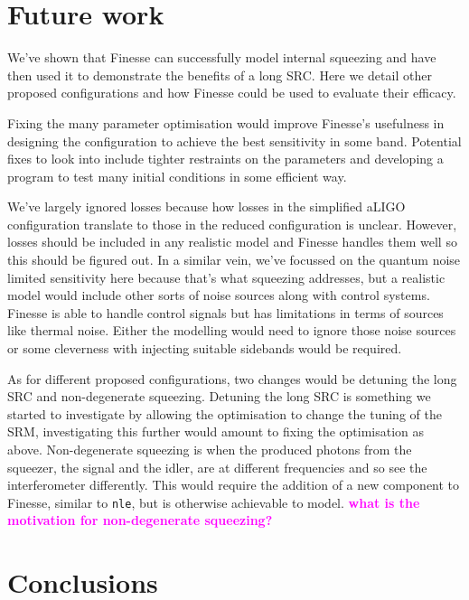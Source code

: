 \documentclass[aps,pra,superscriptaddress,reprint,nofootinbib]{revtex4-1}
\newcommand{\code}[1]{\texttt{#1}}
\newcommand{\jam}[1]{\textcolor{magenta}{\textbf{#1}}}
\begin{document}
\section{Future work}
\label{sec:future_work}

We’ve shown that Finesse can successfully model internal squeezing and have then used it to demonstrate the benefits of a long SRC. Here we detail other proposed configurations and how Finesse could be used to evaluate their efficacy.


Fixing the many parameter optimisation would improve Finesse’s usefulness in designing the configuration to achieve the best sensitivity in some band. Potential fixes to look into include tighter restraints on the parameters and developing a program to test many initial conditions in some efficient way.


We’ve largely ignored losses because how losses in the simplified aLIGO configuration translate to those in the reduced configuration is unclear. However, losses should be included in any realistic model and Finesse handles them well so this should be figured out. In a similar vein, we’ve focussed on the quantum noise limited sensitivity here because that’s what squeezing addresses, but a realistic model would include other sorts of noise sources along with control systems. Finesse is able to handle control signals but has limitations in terms of sources like thermal noise. Either the modelling would need to ignore those noise sources or some cleverness with injecting suitable sidebands would be required.


As for different proposed configurations, two changes would be detuning the long SRC and non-degenerate squeezing. Detuning the long SRC is something we started to investigate by allowing the optimisation to change the tuning of the SRM, investigating this further would amount to fixing the optimisation as above. Non-degenerate squeezing is when the produced photons from the squeezer, the signal and the idler, are at different frequencies and so see the interferometer differently. This would require the addition of a new component to Finesse, similar to \code{nle}, but is otherwise achievable to model. \jam{what is the motivation for non-degenerate squeezing?}



\section{Conclusions}
\label{sec:conclusions}
\end{document}
